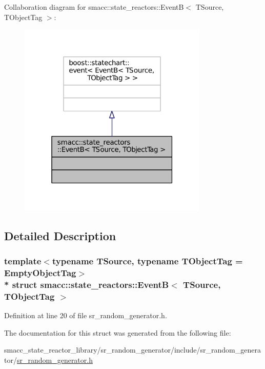 Collaboration diagram for smacc\+:\+:state\+\_\+reactors\+:\+:EventB$<$ T\+Source, T\+Object\+Tag $>$\+:
\nopagebreak
\begin{figure}[H]
\begin{center}
\leavevmode
\includegraphics[width=256pt]{structsmacc_1_1state__reactors_1_1EventB__coll__graph}
\end{center}
\end{figure}


\subsection{Detailed Description}
\subsubsection*{template$<$typename T\+Source, typename T\+Object\+Tag = Empty\+Object\+Tag$>$\\*
struct smacc\+::state\+\_\+reactors\+::\+Event\+B$<$ T\+Source, T\+Object\+Tag $>$}



Definition at line 20 of file sr\+\_\+random\+\_\+generator.\+h.



The documentation for this struct was generated from the following file\+:\begin{DoxyCompactItemize}
\item 
smacc\+\_\+state\+\_\+reactor\+\_\+library/sr\+\_\+random\+\_\+generator/include/sr\+\_\+random\+\_\+generator/\hyperlink{sr__random__generator_8h}{sr\+\_\+random\+\_\+generator.\+h}\end{DoxyCompactItemize}
